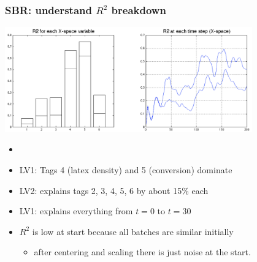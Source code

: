\begin{frame}\frametitle{SBR: understand \( R^2 \) breakdown}
	
	\begin{center}
		\includegraphics[width=0.8\textwidth]{images/sbr/SBR-R2-over-batch.png}
	\end{center}

	\begin{itemize}
		\item	{}
		
		\item	LV1: Tags 4 (latex density) and 5 (conversion) dominate
		
		\item	LV2: explains tags 2, 3, 4, 5, 6 by about 15\% each
		
		\item	LV1: explains everything from \( t = 0 \)  to \( t = 30 \)
		
		\item	\( R^2 \) is low at start because all batches are similar initially
		
				\begin{itemize}
					\item	after centering and scaling there is just noise at the start.
				\end{itemize}
	\end{itemize}

\end{frame}

